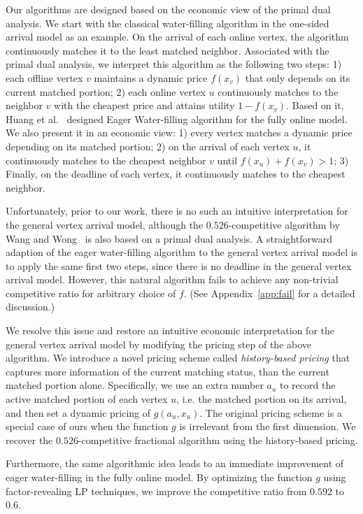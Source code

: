 Our algorithms are designed based on the economic view of the primal dual analysis. 
We start with the classical water-filling algorithm in the one-sided arrival model as an example. On the arrival of each online vertex, the algorithm continuously matches it to the least matched neighbor. Associated with the primal dual analysis, we interpret this algorithm as the following two steps: 1) each offline vertex $v$ maintains a dynamic price $f(x_v)$ that only depends on its current matched portion; 2) each online vertex $u$ continuously matches to the neighbor $v$ with the cheapest price and attains utility $1-f(x_v)$.
Based on it, Huang et al.~\cite{focs/HuangTWZ20} designed Eager Water-filling algorithm for the fully online model. We also present it in an economic view: 1) every vertex matches a dynamic price depending on its matched portion; 2) on the arrival of each vertex $u$, it continuously matches to the cheapest neighbor $v$ until $f(x_u)+f(x_v) > 1$; 3) Finally, on the deadline of each vertex, it continuously matches to the cheapest neighbor.

Unfortunately, prior to our work, there is no such an intuitive interpretation for the general vertex arrival model, although the $0.526$-competitive algorithm by Wang and Wong~\cite{icalp/WangW15} is also based on a primal dual analysis. A straightforward adaption of the eager water-filling algorithm to the general vertex arrival model is to apply the same first two steps, since there is no deadline in the general vertex arrival model.
However, this natural algorithm fails to achieve any non-trivial competitive ratio for arbitrary choice of $f$. (See Appendix~\ref{app:fail} for a detailed discussion.)

We resolve this issue and restore an intuitive economic interpretation for the general vertex arrival model by modifying the pricing step of the above algorithm. We introduce a novel pricing scheme called \emph{history-based pricing} that captures more information of the current matching status, than the current matched portion alone. Specifically, we use an extra number $a_u$ to record the active matched portion of each vertex $u$, i.e. the matched portion on its arrival, and then set a dynamic pricing of $g(a_u,x_u)$. The original pricing scheme is a special case of ours when the function $g$ is irrelevant from the first dimension. We recover the $0.526$-competitive fractional algorithm using the history-based pricing.

Furthermore, the same algorithmic idea leads to an immediate improvement of eager water-filling in the fully online model. By optimizing the function $g$ using factor-revealing LP techniques, we improve the competitive ratio from $0.592$ to $0.6$.

